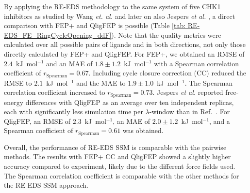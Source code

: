 By applying the RE-EDS methodology to the same system of five CHK1 inhibitors as studied by Wang \textit{et. al.} \cite{Wang2017} and later on also Jespers \textit{et al.} \cite{Jespers2019}, a direct comparison with FEP+ and QligFEP is possible (Table \ref{tab: RE-EDS_FE_RingCycleOpening_ddF}). Note that the quality metrics were calculated over all possible pairs of ligands and in both directions, not only those directly calculated by FEP+ and QligFEP.
For FEP+, we obtained an RMSE of $2.4$~kJ~mol$^{-1}$ and an MAE of $1.8 \pm 1.2$~kJ~mol$^{-1}$ with a Spearman correlation coefficient of $r_{\text{Spearman}}=0.67$.
Including cycle closure correction (CC) \cite{Wang2017} reduced the RMSE to $2.1$~kJ~mol$^{-1}$ and the MAE to $1.9 \pm 1.0$~kJ~mol$^{-1}$. The Spearman correlation coefficient increased to $r_{\text{Spearman}}=0.73$.
Jespers \textit{et al.} \cite{Jespers2019} reported free-energy differences with QligFEP as an average over ten independent replicas, each with significantly less simulation time per $\lambda$-window than in Ref.~\cite{Wang2017}. For QligFEP, an RMSE of $2.3$~kJ~mol$^{-1}$, an MAE of $2.0 \pm 1.2$~kJ~mol$^{-1}$, and a Spearman coefficient of $r_{\text{Spearman}}=0.61$ was obtained.

Overall, the performance of RE-EDS SSM is comparable with the pairwise methods. The results with FEP+ CC and QligFEP showed a slightly higher accuracy compared to experiment, likely due to the different force fields used. The Spearman correlation coefficient is comparable with the other methods for the RE-EDS SSM approach.


